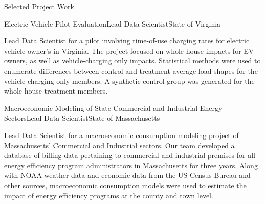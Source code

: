 \documentclass{resume} %
\begin{document}
\begin{rSection}{Selected Project Work}
\begin{rSubsection}{Electric Vehicle Pilot Evaluation}{}{Lead Data Scientist}{State of Virginia}
\item[] Lead Data Scientist for a pilot involving time-of-use charging rates for electric vehicle owner's in Virginia. The project focused on whole house impacts for EV owners, as well as vehicle-charging only impacts. Statistical methods were used to enumerate differences between control and treatment average load shapes for the vehicle-charging only members. A synthetic control group was generated for the whole house treatment members.
\end{rSubsection}

\begin{rSubsection}{Macroeconomic Modeling of State Commercial and Industrial Energy Sectors}{}{Lead Data Scientist}{State of Massachusetts}
\item[] Lead Data Scientist for a macroeconomic consumption modeling project of Massachusetts' Commercial and Industrial sectors. Our team developed a database of billing data pertaining to commercial and industrial premises for all energy efficiency program administrators in Massachusetts for three years. Along with NOAA weather data and economic data from the US Census Bureau and other sources, macroeconomic consumption models were used to estimate the impact of energy efficiency programs at the county and town level.
\end{rSubsection}


\end{rSection}

\pagebreak
\end{document}
